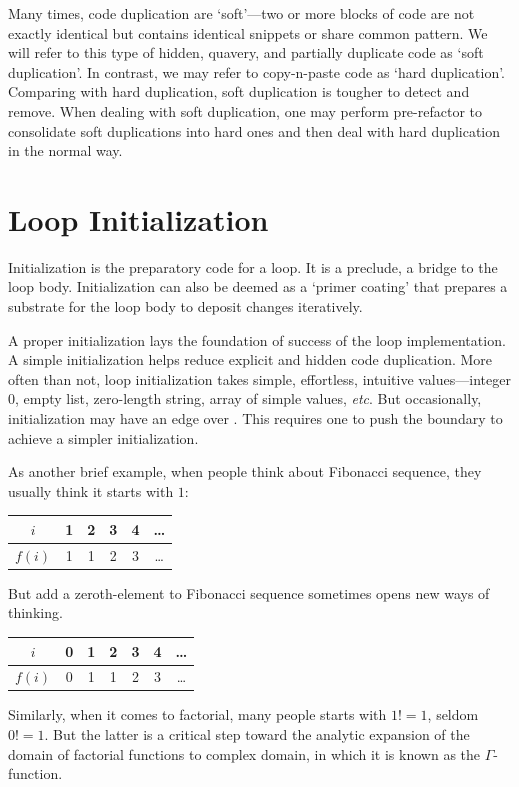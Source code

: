 Many times, code duplication are `soft'---two or more blocks of code are not exactly
identical but contains identical snippets or share common pattern.
We will refer to this type of hidden, quavery, and partially duplicate code as
`soft duplication'.
In contrast, we may refer to copy-n-paste code as `hard duplication'.
Comparing with hard duplication, soft duplication is tougher to detect and remove.
When dealing with soft duplication, one may perform pre-refactor to
consolidate soft duplications into hard ones and then deal with hard duplication in the normal way.


\section{Loop Initialization}\label{sec:loopInitialization}

Initialization is the preparatory code for a loop.
It is a preclude, a bridge to the loop body.
Initialization can also be deemed as a `primer coating' that prepares a substrate for the loop
body to deposit changes iteratively.


A proper initialization lays the foundation of success of the loop implementation.
A simple initialization helps reduce explicit and hidden code duplication.
More often than not, loop initialization takes simple, effortless,
intuitive values---integer $0$, empty list, zero-length string, array of simple values,
\textit{etc}.
But occasionally, initialization  may have an edge over .
This requires one to push the boundary to achieve a simpler initialization.


As another brief example, when people think about Fibonacci sequence, they usually think it starts
with $1$:
\begin{table}[H]
    \centering
    \begin{tabular}{c|c|c|c|c|c}
        \hline
        $i$ & 1 & 2 & 3 & 4 & \ldots \\
        \hline
        $f(i)$ & 1 & 1 & 2 & 3 & \ldots \\
        \hline
    \end{tabular}
\end{table}
But add a zeroth-element to Fibonacci sequence sometimes opens new ways of thinking.
\begin{table}[H]
    \centering
    \begin{tabular}{c|c|c|c|c|c|c}
        \hline
        $i$ & 0 & 1 & 2 & 3 & 4 & \ldots \\
        \hline
        $f(i)$ & 0 & 1 & 1 & 2 & 3 & \ldots \\
        \hline
    \end{tabular}
\end{table}
Similarly, when it comes to factorial, many people starts with $1!=1$, seldom $0!=1$.
But the latter is a critical step toward the analytic expansion of the domain of factorial
functions to complex domain, in which it is known as the $\Gamma$-function.



